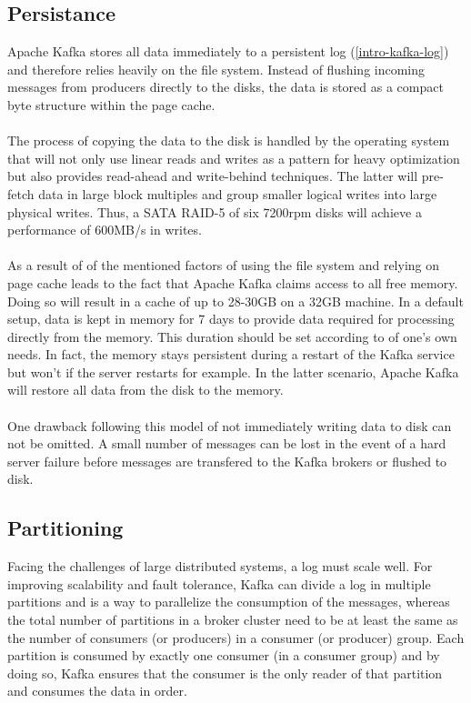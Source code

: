 \subsection{Persistance}
Apache Kafka stores all data immediately to a persistent log
(\ref{intro-kafka-log}) 
and therefore relies heavily on the \gls{file system}.
Instead of flushing incoming messages from producers directly to the disks, the
data is stored as a compact byte structure within the \gls{page cache}.
\\ \\
The process of copying the data to the disk is handled by the operating system
that will not only use linear reads and writes  as a pattern for heavy
optimization but also provides read-ahead and write-behind techniques.
The latter will pre-fetch data in large block multiples and group smaller logical
writes into large physical writes. Thus, a SATA RAID-5 of six 7200rpm
disks will achieve a performance of 600MB/s in writes.
\\ \\
As a result of of the mentioned factors of using the file system and relying on
\gls{page cache} leads to the fact that Apache Kafka claims access to all free memory.
Doing so will result in a cache of up to 28-30GB on a 32GB machine. In a default
setup, data is kept in memory for 7 days to provide data required for processing
directly from the memory. This duration should be set according to of one's own
needs. In fact, the memory stays persistent during a restart of the Kafka
service but won't if the server restarts for example. In the latter scenario,
Apache Kafka will restore all data from the disk to the memory.
\cite{apachekafka} \\ \\
One drawback following this model of not immediately writing data to disk can not be
omitted. A small number of messages can be lost in the event of a hard server
failure before messages are transfered to the Kafka brokers or flushed to disk.
\cite{goodhope2012building}

\subsection{Partitioning}
\label{kafka-partitioning}
Facing the challenges of large distributed systems, a log must scale well. For
improving scalability and fault tolerance, Kafka can divide a log in multiple
partitions and is a way to parallelize the consumption of the messages, whereas
the total number of partitions in a broker cluster need to be at least the same
as the number of consumers (or producers) in a consumer (or producer) group.
Each partition is consumed by exactly one consumer (in a consumer group) and by
doing so, Kafka ensures that the consumer is the only reader of that partition
and consumes the data in order.


